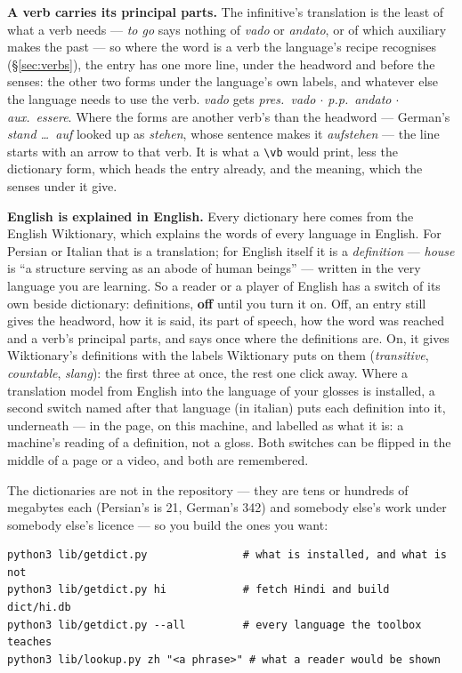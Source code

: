 \documentclass[11pt,oneside]{report}
\newcommand{\iw}[1]{\foreignlanguage{italian}{\emph{#1}}}
\newcommand{\gw}[1]{\foreignlanguage{ngerman}{\emph{#1}}}
\newcommand{\menu}[1]{\textsf{#1}}
\begin{document}
\textbf{A verb carries its principal parts.} The infinitive's translation is
the least of what a verb needs --- \emph{to go} says nothing of
\iw{vado} or \iw{andato}, or of which auxiliary makes the past --- so where
the word is a verb the language's recipe recognises (\S\ref{sec:verbs}), the
entry has one more line, under the headword and before the senses: the other
two forms under the language's own labels, and whatever else the language
needs to use the verb. \iw{vado} gets \emph{pres.\ vado $\cdot$ p.p.\ andato
$\cdot$ aux.\ essere}. Where the forms are another verb's than the headword
--- German's \gw{stand \ldots\ auf} looked up as \gw{stehen}, whose
sentence makes it \gw{aufstehen} --- the line starts with an arrow to that
verb. It is what a \texttt{\textbackslash vb} would print, less the
dictionary form, which heads the entry already, and the meaning, which the
senses under it give.

\textbf{English is explained in English.} Every dictionary here comes from
the English Wiktionary, which explains the words of every language in
English. For Persian or Italian that is a translation; for English itself it
is a \emph{definition} --- \emph{house} is ``a structure serving as an abode
of human beings'' --- written in the very language you are learning. So a
reader or a player of English has a switch of its own beside
\menu{dictionary}: \menu{definitions}, \textbf{off} until you turn it on.
Off, an entry still gives the headword, how it is said, its part of speech,
how the word was reached and a verb's principal parts, and says once where
the definitions are. On, it gives Wiktionary's definitions with the labels
Wiktionary puts on them (\emph{transitive}, \emph{countable}, \emph{slang}):
the first three at once, the rest one click away. Where a translation model
from English into the language of your glosses is installed, a second switch
named after that language (\menu{in italian}) puts each definition into it,
underneath --- in the page, on this machine, and labelled as what it is: a
machine's reading of a definition, not a gloss. Both switches can be flipped
in the middle of a page or a video, and both are remembered.

The dictionaries are not in the repository --- they are tens or hundreds of
megabytes each (Persian's is 21, German's 342) and somebody else's work
under somebody else's licence --- so you build the ones you want:

\begin{lstlisting}
python3 lib/getdict.py               # what is installed, and what is not
python3 lib/getdict.py hi            # fetch Hindi and build dict/hi.db
python3 lib/getdict.py --all         # every language the toolbox teaches
python3 lib/lookup.py zh "<a phrase>" # what a reader would be shown
\end{lstlisting}
\end{document}
